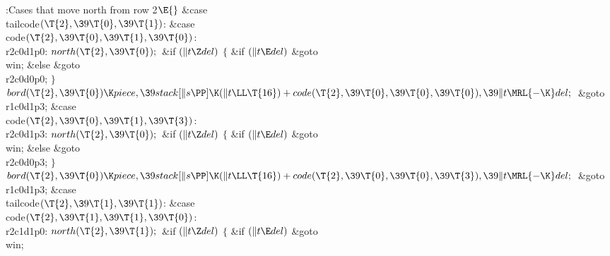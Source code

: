 \B{}:Cases that move north from row 2\X${}\E{}$\6
\4\&{case} \\{tailcode}${}(\T{2},\39\T{0},\39\T{1}){}$:\5
\&{case} \\{code}${}(\T{2},\39\T{0},\39\T{1},\39\T{0}){}$:\5
\\{r2c0d1p0}:\5
${}\\{north}(\T{2},\39\T{0});{}$\6
\&{if} ${}(\|t\Z\\{del}){}$\5
${}\{{}$\5
\1\&{if} ${}(\|t\E\\{del}){}$\1\5
\&{goto} \\{win};\5
\2\&{else}\1\5
\&{goto} \\{r2c0d0p0};\5
\2${}\}{}$\2\6
${}\\{bord}(\T{2},\39\T{0})\K\\{piece},\39\\{stack}[\|s\PP]\K(\|t\LL\T{16})+%
\\{code}(\T{2},\39\T{0},\39\T{0},\39\T{0}),\39\|t\MRL{-{\K}}\\{del};{}$\6
\&{goto} \\{r1c0d1p3};\6
\4\&{case} \\{code}${}(\T{2},\39\T{0},\39\T{1},\39\T{3}){}$:\5
\\{r2c0d1p3}:\5
${}\\{north}(\T{2},\39\T{0});{}$\6
\&{if} ${}(\|t\Z\\{del}){}$\5
${}\{{}$\5
\1\&{if} ${}(\|t\E\\{del}){}$\1\5
\&{goto} \\{win};\5
\2\&{else}\1\5
\&{goto} \\{r2c0d0p3};\5
\2${}\}{}$\2\6
${}\\{bord}(\T{2},\39\T{0})\K\\{piece},\39\\{stack}[\|s\PP]\K(\|t\LL\T{16})+%
\\{code}(\T{2},\39\T{0},\39\T{0},\39\T{3}),\39\|t\MRL{-{\K}}\\{del};{}$\6
\&{goto} \\{r1c0d1p3};\6
\4\&{case} \\{tailcode}${}(\T{2},\39\T{1},\39\T{1}){}$:\5
\&{case} \\{code}${}(\T{2},\39\T{1},\39\T{1},\39\T{0}){}$:\5
\\{r2c1d1p0}:\5
${}\\{north}(\T{2},\39\T{1});{}$\6
\&{if} ${}(\|t\Z\\{del}){}$\5
${}\{{}$\5
\1\&{if} ${}(\|t\E\\{del}){}$\1\5
\&{goto} \\{win};\5

